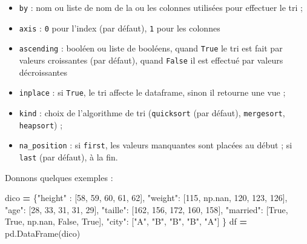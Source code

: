 \documentclass[12pt,]{book}
\newenvironment{Shaded}{\begin{snugshade}}{\end{snugshade}}
\newcommand{\DecValTok}[1]{\textcolor[rgb]{0.00,0.00,0.81}{#1}}
\newcommand{\StringTok}[1]{\textcolor[rgb]{0.31,0.60,0.02}{#1}}
\newcommand{\VariableTok}[1]{\textcolor[rgb]{0.00,0.00,0.00}{#1}}
\newcommand{\OperatorTok}[1]{\textcolor[rgb]{0.81,0.36,0.00}{\textbf{#1}}}
\newcommand{\NormalTok}[1]{#1}
\providecommand{\tightlist}{%
  \setlength{\itemsep}{0pt}\setlength{\parskip}{0pt}}
\numberwithin{equation}{section}
\numberwithin{countremarque}{section}
\begin{document}
\begin{itemize}
\tightlist
\item
  \texttt{by} : nom ou liste de nom de la ou les colonnes utilisées pour
  effectuer le tri ;
\item
  \texttt{axis} : \texttt{0} pour l'index (par défaut), \texttt{1} pour
  les colonnes
\item
  \texttt{ascending} : booléen ou liste de booléens, quand \texttt{True}
  le tri est fait par valeurs croissantes (par défaut), quand
  \texttt{False} il est effectué par valeurs décroissantes
\item
  \texttt{inplace} : si \texttt{True}, le tri affecte le dataframe,
  sinon il retourne une vue ;
\item
  \texttt{kind} : choix de l'algorithme de tri (\texttt{quicksort} (par
  défaut), \texttt{mergesort}, \texttt{heapsort}) ;
\item
  \texttt{na\_position} : si \texttt{first}, les valeurs manquantes sont
  placées au début ; si \texttt{last} (par défaut), à la fin.
\end{itemize}

Donnons quelques exemples :

\begin{Shaded}
\begin{Highlighting}[]
\NormalTok{dico }\OperatorTok{=}\NormalTok{ \{}\StringTok{"height"}\NormalTok{ : [}\DecValTok{58}\NormalTok{, }\DecValTok{59}\NormalTok{, }\DecValTok{60}\NormalTok{, }\DecValTok{61}\NormalTok{, }\DecValTok{62}\NormalTok{],}
        \StringTok{"weight"}\NormalTok{: [}\DecValTok{115}\NormalTok{, np.nan, }\DecValTok{120}\NormalTok{, }\DecValTok{123}\NormalTok{, }\DecValTok{126}\NormalTok{],}
        \StringTok{"age"}\NormalTok{: [}\DecValTok{28}\NormalTok{, }\DecValTok{33}\NormalTok{, }\DecValTok{31}\NormalTok{, }\DecValTok{31}\NormalTok{, }\DecValTok{29}\NormalTok{],}
        \StringTok{"taille"}\NormalTok{: [}\DecValTok{162}\NormalTok{, }\DecValTok{156}\NormalTok{, }\DecValTok{172}\NormalTok{, }\DecValTok{160}\NormalTok{, }\DecValTok{158}\NormalTok{],}
        \StringTok{"married"}\NormalTok{: [}\VariableTok{True}\NormalTok{, }\VariableTok{True}\NormalTok{, np.nan, }\VariableTok{False}\NormalTok{, }\VariableTok{True}\NormalTok{],}
        \StringTok{"city"}\NormalTok{: [}\StringTok{"A"}\NormalTok{, }\StringTok{"B"}\NormalTok{, }\StringTok{"B"}\NormalTok{, }\StringTok{"B"}\NormalTok{, }\StringTok{"A"}\NormalTok{]}
\NormalTok{       \} }
\NormalTok{df }\OperatorTok{=}\NormalTok{ pd.DataFrame(dico)}
\end{Highlighting}
\end{Shaded}
\end{document}
